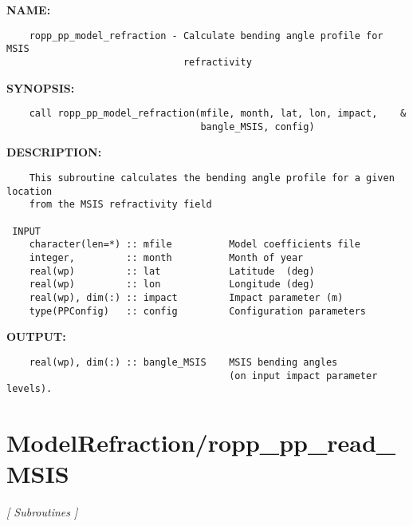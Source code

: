 \label{ch:robo37}
\label{ch:ModelRefraction_ropp_pp_model_refraction}
\textbf{NAME:}\hspace{0.08in}\begin{Verbatim}
    ropp_pp_model_refraction - Calculate bending angle profile for MSIS 
                               refractivity
\end{Verbatim}
\textbf{SYNOPSIS:}\hspace{0.08in}\begin{Verbatim}
    call ropp_pp_model_refraction(mfile, month, lat, lon, impact,    &
                                  bangle_MSIS, config)
\end{Verbatim}
\textbf{DESCRIPTION:}\hspace{0.08in}\begin{Verbatim}
    This subroutine calculates the bending angle profile for a given location
    from the MSIS refractivity field

 INPUT
    character(len=*) :: mfile          Model coefficients file
    integer,         :: month          Month of year
    real(wp)         :: lat            Latitude  (deg)
    real(wp)         :: lon            Longitude (deg)
    real(wp), dim(:) :: impact         Impact parameter (m)
    type(PPConfig)   :: config         Configuration parameters
\end{Verbatim}
\textbf{OUTPUT:}\hspace{0.08in}\begin{Verbatim}
    real(wp), dim(:) :: bangle_MSIS    MSIS bending angles 
                                       (on input impact parameter levels).
\end{Verbatim}
\section{ModelRefraction/ropp\_pp\_read\_MSIS}
\textsl{[ Subroutines ]}


